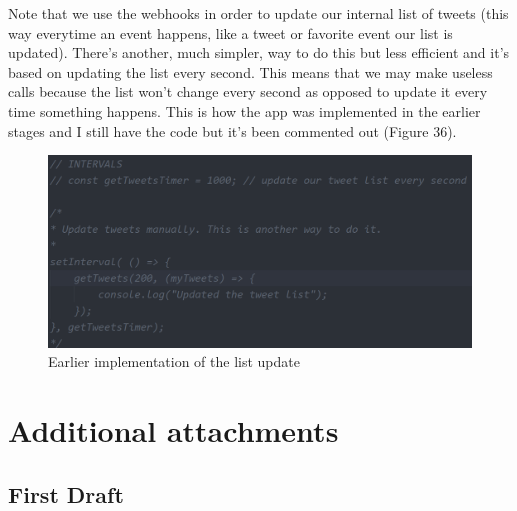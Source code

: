\documentclass[12pt]{article} %
\begin{document}
\begin{enumerate}
		Note that we use the webhooks in order to update our internal list of tweets (this way everytime an event happens, like a tweet or favorite event our list is updated).
		There's another, much simpler, way to do this but less efficient and it's based on updating the list every second. This means that we may make useless calls because
		the list won't change every second as opposed to update it every time something happens. This is how the app was implemented in the earlier stages and I still have the code
		but it's been commented out (Figure 36).

		\begin{figure}[H] %
		\includegraphics[width=1\linewidth]{images/intervalUpdate}
		\caption{Earlier implementation of the list update}
		\label{intervalUpdate}
		\end{figure}

	\end{enumerate}



\section{Additional attachments} %

\subsection{First Draft}
\end{document}
